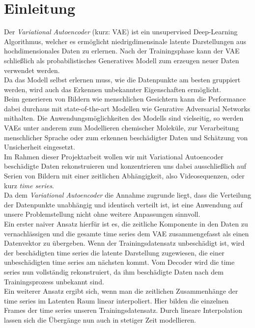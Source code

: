 \documentclass[12pt]{article}
\begin{document}
	\tableofcontents
	\newpage
	\section[Einleitung]{Einleitung}
	Der \emph{Variational Autoencoder} (kurz: VAE) ist ein unsupervised Deep-Learning Algorithmus, welcher es ermöglicht niedrigdimensinale latente Darstellungen aus hochdimensionales Daten zu erlernen. Nach der Trainingsphase kann der VAE schließlich als probabilistisches Generatives Modell zum erzeugen neuer Daten verwendet werden.\\
	Da das Modell selbst erlernen muss,
	wie die Datenpunkte am besten gruppiert werden, wird auch das Erkennen unbekannter Eigenschaften ermöglicht.\\
	Beim generieren von Bildern wie menschlichen Gesichtern kann die Performance dabei durchaus mit state-of-the-art Modellen wie Genrative Adversarial Networks mithalten. Die Anwendungsmöglichkeiten des Modells sind vielseitig, so werden VAEs unter anderem zum Modellieren chemischer Moleküle, zur Verarbeitung menschlicher Sprache oder zum erkennen beschädigter Daten und Schätzung von Unsicherheit eingesetzt.\\
	Im Rahmen dieser Projektarbeit wollen wir mit Variational Autoencoder beschädigte Daten rekonstruieren und konzentrieren uns dabei ausschließlich auf Serien von Bildern mit einer zeitlichen Abhängigkeit, also Videosequenzen, oder kurz \emph{time series}. \\
	Da dem \emph{Variational Autoencoder} die Annahme zugrunde liegt, dass die Verteilung der Datenpunkte
	unabhängig und identisch verteilt ist, ist eine Anwendung auf unsere Problemstellung nicht ohne weitere
	Anpassungen sinnvoll.\\
	Ein erster naiver Ansatz hierfür ist es, die zeitliche Komponente in den Daten zu
	vernachlässigen und die gesamte time series dem VAE zusammengefasst als einen Datenvektor zu übergeben. Wenn der Trainingsdatensatz unbeschädigt ist, wird der beschädigten time series die latente Darstellung zugewiesen, die einer unbeschädigten time series am nächsten kommt. Vom Decoder wird die time series nun vollständig rekonstruiert, da ihm beschädigte Daten nach dem Trainingsprozess unbekannt sind.\\
	Ein weiterer Ansatz ergibt sich, wenn man die zeitlichen Zusammenhänge der time series
	im Latenten Raum linear interpoliert. Hier bilden die einzelnen Frames der time series unseren Trainingsdatensatz. Durch lineare Interpolation lassen sich die Übergänge nun auch in stetiger Zeit modellieren. \\
\end{document}
